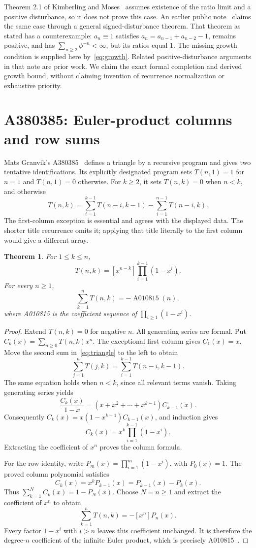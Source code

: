 \documentclass[11pt]{article}
\newtheorem{theorem}{Theorem}[section]
\begin{document}
Theorem 2.1 of Kimberling and Moses~\cite{KM} assumes existence of the
ratio limit and a positive disturbance, so it does not prove this case.
An earlier public note~\cite{Note} claims the same case through a general
signed-disturbance theorem. That theorem as stated has a counterexample:
$a_n\equiv1$ satisfies $a_n=a_{n-1}+a_{n-2}-1$, remains positive, and has
$\sum_{n\ge2}\phi^{-n}<\infty$, but its ratios equal $1$.
The missing growth condition is supplied here by~\eqref{eq:growth}.
Related positive-disturbance arguments in that note are prior work. We
claim the exact formal completion and derived growth bound, without
claiming invention of recurrence normalization or exhaustive priority.

\section{A380385: Euler-product columns and row sums}

Mats Granvik's A380385~\cite{A380385} defines a triangle by a recursive
program and gives two tentative identifications. Its explicitly designated
program sets $T(n,1)=1$ for $n=1$ and $T(n,1)=0$ otherwise. For $k\ge2$,
it sets $T(n,k)=0$ when $n<k$, and otherwise
\begin{equation}\label{eq:triangle}
 T(n,k)=\sum_{i=1}^{k-1}T(n-i,k-1)
        -\sum_{i=1}^{n-1}T(n-i,k).
\end{equation}
The first-column exception is essential and agrees with the displayed
data. The shorter title recurrence omits it; applying that title literally
to the first column would give a different array.

\begin{theorem}\label{thm:triangle}
For $1\le k\le n$,
\[
 T(n,k)=[x^{n-k}]\prod_{i=1}^{k-1}(1-x^i).
\]
For every $n\ge1$,
\[
 \sum_{k=1}^{n}T(n,k)=-\operatorname{A010815}(n),
\]
where A010815 is the coefficient sequence of
$\prod_{i\ge1}(1-x^i)$.
\end{theorem}

\begin{proof}
Extend $T(n,k)=0$ for negative $n$. All generating series are formal. Put
$C_k(x)=\sum_{n\ge0}T(n,k)x^n$. The exceptional first column gives
$C_1(x)=x$. Move the second sum in~\eqref{eq:triangle} to the left to obtain
\[
 \sum_{j=1}^{n}T(j,k)=\sum_{i=1}^{k-1}T(n-i,k-1).
\]
The same equation holds when $n<k$, since all relevant terms vanish.
Taking generating series yields
\[
 \frac{C_k(x)}{1-x}=(x+x^2+\cdots+x^{k-1})C_{k-1}(x).
\]
Consequently $C_k(x)=x(1-x^{k-1})C_{k-1}(x)$, and induction gives
\[
 C_k(x)=x^k\prod_{i=1}^{k-1}(1-x^i).
\]
Extracting the coefficient of $x^n$ proves the column formula.

For the row identity, write $P_m(x)=\prod_{i=1}^m(1-x^i)$, with
$P_0(x)=1$. The proved column polynomial satisfies
\[
 C_k(x)=x^kP_{k-1}(x)=P_{k-1}(x)-P_k(x).
\]
Thus $\sum_{k=1}^{N}C_k(x)=1-P_N(x)$. Choose $N=n\ge1$ and extract
the coefficient of $x^n$ to obtain
\[
 \sum_{k=1}^{n}T(n,k)=-[x^n]P_n(x).
\]
Every factor $1-x^i$ with $i>n$ leaves this coefficient unchanged.
It is therefore the degree-$n$ coefficient of the infinite Euler product,
which is precisely A010815~\cite{A010815}.
\end{proof}
\end{document}
